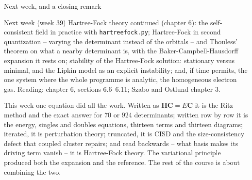 \documentclass[aspectratio=169,10pt]{beamer}
\begin{document}
\begin{frame}{Next week, and a closing remark}
  \begin{exampleblock}{Next week (week 39)}
    Hartree-Fock theory continued (chapter 6): the self-consistent field in practice with \texttt{hartreefock.py}; Hartree-Fock in second quantization -- varying the determinant instead of the orbitals -- and Thouless' theorem on what a nearby determinant is, with the Baker-Campbell-Hausdorff expansion it rests on; stability of the Hartree-Fock solution: stationary versus minimal, and the Lipkin model as an explicit instability; and, if time permits, the one system where the whole programme is analytic, the homogeneous electron gas. Reading: chapter 6, sections 6.6--6.11; Szabo and Ostlund chapter 3.
  \end{exampleblock}
  \vspace{0.5em}
  This week one equation did all the work. Written as $\bm{H}\bm{C}=E\bm{C}$ it is the Ritz method and the exact answer for $70$ or $924$ determinants; written row by row it is the energy, singles and doubles equations, thirteen terms and thirteen diagrams; iterated, it is perturbation theory; truncated, it is CISD and the size-consistency defect that coupled cluster repairs; and read backwards -- what basis makes its driving term vanish -- it is Hartree-Fock theory. The variational principle produced both the expansion and the reference. The rest of the course is about combining the two.
\end{frame}
\end{document}
